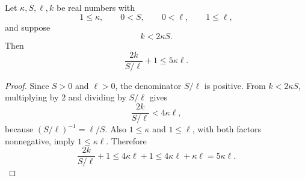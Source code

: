 \begin{helper}
Let \(\kappa,S,\ell,k\) be real numbers with
\[
1\le \kappa,\qquad 0<S,\qquad 0<\ell,\qquad 1\le \ell,
\]
and suppose
\[
k<2\kappa S.
\]
Then
\[
\frac{2k}{S/\ell}+1\le 5\kappa\ell.
\]
\end{helper}
\begin{proof}
Since \(S>0\) and \(\ell>0\), the denominator \(S/\ell\) is positive.  From
\(k<2\kappa S\), multiplying by \(2\) and dividing by \(S/\ell\) gives
\[
\frac{2k}{S/\ell}<4\kappa\ell,
\]
because \((S/\ell)^{-1}=\ell/S\).  Also \(1\le\kappa\) and \(1\le\ell\), with
both factors nonnegative, imply \(1\le\kappa\ell\).  Therefore
\[
\frac{2k}{S/\ell}+1
\le 4\kappa\ell+1
\le 4\kappa\ell+\kappa\ell
=5\kappa\ell.
\]
\end{proof}
